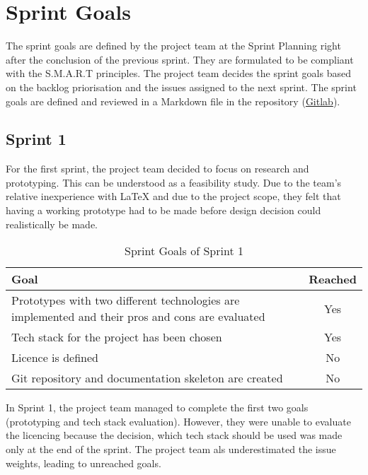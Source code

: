 \section{Sprint Goals}
The sprint goals are defined by the project team at the Sprint Planning right after the conclusion of the previous sprint.
They are formulated to be compliant with the S.M.A.R.T principles. The project team decides the sprint goals based on the backlog
priorisation and the issues assigned to the next sprint. The sprint goals are defined and reviewed in a Markdown file in the repository (\href{https://gitlab.ti.bfh.ch/decibel-threshold-event-displayer/decibel-threshold-event-displayer/-/blob/main/doc/scrum/sprints.md}{Gitlab}).
\subsection{Sprint 1}
For the first sprint, the project team decided to focus on research and prototyping. This can be understood as a feasibility study.
Due to the team's relative inexperience with LaTeX and due to the project scope, they felt that having a working prototype had to be
made before design decision could realistically be made. \\
\begin{table}[H]
    \centering
    \begin{tabularx}{\textwidth}{X c}
        \toprule
        \textbf{Goal}                                                                                    & \textbf{Reached} \\
        \midrule
        Prototypes with two different technologies are implemented and their pros and cons are evaluated & Yes              \\
        \midrule
        Tech stack for the project has been chosen                                                       & Yes              \\
        \midrule
        Licence is defined                                                                               & No               \\
        \midrule
        Git repository and documentation skeleton are created                                            & No               \\
        \bottomrule
    \end{tabularx}
    \caption{Sprint Goals of Sprint 1}\label{table:sprint_goals1}
\end{table}
In Sprint 1, the project team managed to complete the first two goals (prototyping and tech stack evaluation). However, they were unable to
evaluate the licencing because the decision, which tech stack should be used was made only at the end of the sprint. The project team als underestimated
the issue weights, leading to unreached goals.
